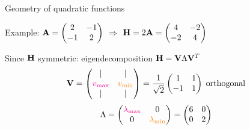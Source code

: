 \documentclass[11pt,compress,t,notes=noshow, xcolor=table]{beamer}
\begin{document}



\begin{framei}{Geometry of quadratic functions}
\item Example: $\mathbf{A} = \begin{pmatrix} 2 & -1 \\ -1 & 2\end{pmatrix}$ $\Rightarrow$ $\mathbf{H} = 2\mathbf{A} = \begin{pmatrix} 4 & -2 \\ -2 & 4\end{pmatrix}$
\item Since $\mathbf{H}$ symmetric: eigendecomposition $\mathbf{H} = \mathbf{V}\Lambda\mathbf{V}^T$
\begin{equation*}
\mathbf{V} = \begin{pmatrix}
| & | \\
\textcolor{magenta}{v_\text{max}} & \textcolor{orange}{v_\text{min}} \\
| & |
\end{pmatrix}
= \frac{1}{\sqrt{2}} \begin{pmatrix}
1 & 1 \\
-1 & 1
\end{pmatrix}\;\text{orthogonal}
\end{equation*}
\begin{equation*}
\Lambda = \begin{pmatrix}
\textcolor{magenta}{\lambda_\text{max}} & 0 \\
0 & \textcolor{orange}{\lambda_\text{min}}
\end{pmatrix}
= \begin{pmatrix}6 & 0 \\ 0 & 2\end{pmatrix}
\end{equation*}
\end{framei}
\end{document}
